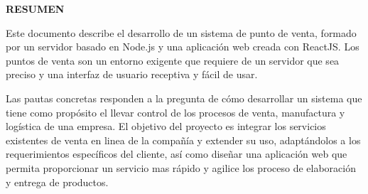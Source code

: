 
\begin{center}
  {\Large \bf{RESUMEN}}
\end{center}
Este documento describe el desarrollo de un sistema de punto de venta, formado por un servidor basado en Node.js y una aplicación web creada con ReactJS. Los puntos de venta son un entorno exigente que requiere de un servidor que sea preciso y una interfaz de usuario receptiva y fácil de usar. 
\vspace{0.8cm}

Las pautas concretas responden a la pregunta de cómo desarrollar un sistema que tiene como propósito el llevar control de los procesos de venta, manufactura y logística de una empresa. El objetivo del proyecto es integrar los servicios existentes de venta en linea de la compañía y extender su uso, adaptándolos a los requerimientos específicos del cliente, así como diseñar una aplicación web que permita proporcionar un servicio mas rápido y agilice los proceso de elaboración y entrega de productos.